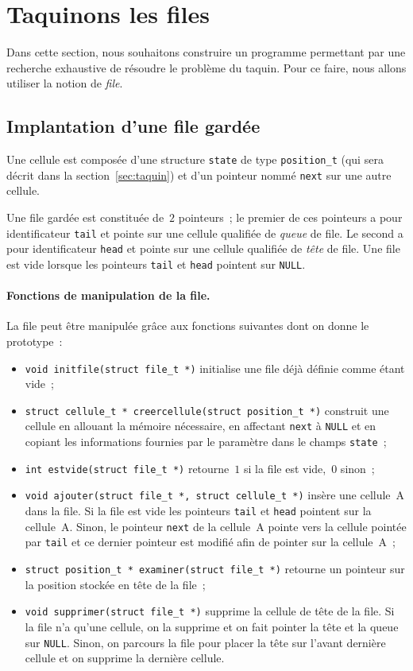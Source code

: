 \section{Taquinons les files}
\label{sec:TaquinFile}
Dans cette section, nous souhaitons construire un programme permettant
par une recherche exhaustive de r\'esoudre le probl\`eme du taquin.
Pour ce faire, nous allons utiliser la notion de \textit{file}.
\subsection{Implantation d'une file gard\'ee}
\label{sec:file}
Une cellule est compos\'ee d'une structure \texttt{state} de type
\texttt{position\_t} (qui sera d\'ecrit dans la
section~\ref{sec:taquin}) et d'un pointeur nomm\'e \texttt{next} sur
une autre cellule.
\par
Une file gard\'ee est constitu\'ee de~$2$ pointeurs~; le premier de
ces pointeurs a pour identificateur \texttt{tail} et pointe sur une
cellule qualifi\'ee de \textit{queue} de file. Le second a pour
identificateur \texttt{head} et pointe sur une cellule qualifi\'ee de
\textit{t\^ete} de file. Une file est vide lorsque les pointeurs
\texttt{tail} et \texttt{head} pointent sur \texttt{NULL}.
\paragraph{Fonctions de manipulation de la file.}
La file peut \^etre manipul\'ee gr\^ace aux fonctions suivantes dont
on donne le prototype~:
\begin{itemize}
\item \verb?void initfile(struct file_t *)? initialise une file
  d\'ej\`a d\'efinie comme \'etant vide~;
\item \verb?struct cellule_t * creercellule(struct position_t *)?
  construit une cellule en allouant la m\'emoire n\'ecessaire, en
  affectant \texttt{next} \`a \texttt{NULL} et en copiant les
  informations fournies par le param\`etre dans le champs
  \texttt{state}~;
\item \verb?int estvide(struct file_t *)? retourne~$1$ si la file est
  vide,~$0$ sinon~;
\item \verb?void ajouter(struct file_t *, struct cellule_t *)?
  ins\`ere une cellule~A dans la file.  Si la file est vide les
  pointeurs \texttt{tail} et \texttt{head} pointent sur la cellule~A.
  Sinon, le pointeur \texttt{next} de la cellule~A pointe vers la
  cellule point\'ee par \texttt{tail} et ce dernier pointeur est
  modifi\'e afin de pointer sur la cellule~A~;
  \item \verb?struct position_t * examiner(struct file_t *)? retourne un
  pointeur sur la position stock\'ee en t\^ete de la file~;
\item \verb?void supprimer(struct file_t *)? supprime la cellule de
  t\^ete de la file.  Si la file n'a qu'une cellule, on la supprime et
  on fait pointer la t\^ete et la queue sur \texttt{NULL}. Sinon, on
  parcours la file pour placer la t\^ete sur l'avant derni\`ere
  cellule et on supprime la derni\`ere cellule.
\end{itemize}

